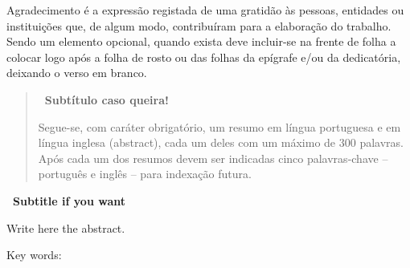 \begin{acknowledgements}

Agradecimento é a expressão registada de uma gratidão às pessoas, entidades ou instituições que, de algum modo, contribuíram para a elaboração do trabalho. Sendo um elemento opcional, quando exista deve incluir-se na frente de folha a colocar logo após a folha de rosto ou das folhas da epígrafe e/ou da dedicatória, deixando o verso em branco.

\end{acknowledgements}%



\begin{abstract}

\noindent \textbf{\ Subtítulo caso queira!}

\noindent Segue-se, com caráter obrigatório, um resumo em língua portuguesa e em língua inglesa (abstract), cada um deles com um máximo de 300 palavras.
Após cada um dos resumos devem ser indicadas cinco palavras-chave – português e inglês – para indexação futura.


\end{abstract}



\begin{abstractotherlanguage}

\noindent \textbf{\ Subtitle if you want}

\noindent Write here the abstract.

\noindent \newline Key words:

\end{abstractotherlanguage}



\tableofcontents %

\listoffigures %

